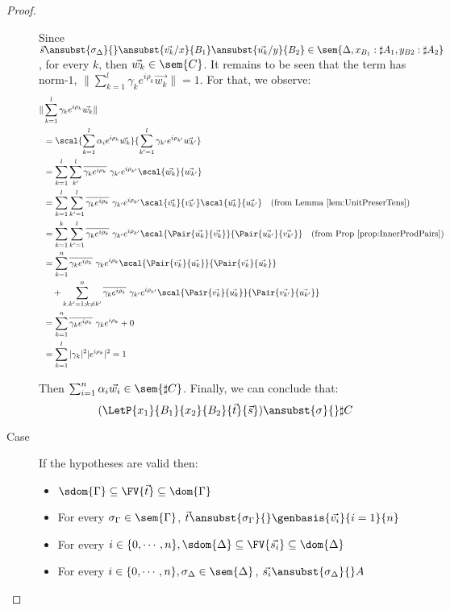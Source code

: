 \begin{proof}
\begin{description}
    Since $\vec{s}\ansubst{\sigma_\Delta}{}\ansubst{\vec{v_k}/x}{B_1}\ansubst{\vec{u_k}/y}{B_2}\in\sem{\Delta, x_{B_1}:\sharp A_1, y_{B2}:\sharp A_2}$, for every $k$, then $\vec{w_k}\in\sem{C}$. It remains to be seen that the term has norm-$1$, $\|\sum_{k=1}^{l}\gamma_k e^{i\rho_k} \vec{w_k}\|=1$. For that, we observe:
    \begin{align*}
        \|&\sum_{k=1}^{l}\gamma_k e^{i\rho_k} \vec{w_k}\| \\
        &= \scal{\sum_{k=1}^{l}\alpha_i e^{i\rho_k} \vec{w_k}}{\sum_{k'=1}^{l}\gamma_{k'} e^{i\rho_{k'}} \vec{w_{k'}}}\\
        &= \sum_{k=1}^{l}\sum_{k'}^{l}\overline{\gamma_k e^{i\rho_k}}\  \gamma_{k'} e^{i\rho_{k'}}\scal{\vec{w_k}}{\vec{w_{k'}}}\\
        &=\sum_{k=1}^{l}\sum_{k'=1}^{l}\overline{\gamma_k e^{i\rho_k}}\ \gamma_{k'} e^{i\rho_{k'}} \scal{\vec{v_k}}{\vec{v_{k'}}}\scal{\vec{u_k}}{\vec{u_{k'}}}\quad(\text{from Lemma \ref{lem:UnitPreserTens}})\\
        &= \sum_{k=1}^{k}\sum_{k'=1}^{l}\overline{\gamma_k e^{i\rho_k}}\  \gamma_{k'} e^{i\rho_{k'}} \scal{\Pair{\vec{u_k}}{\vec{v_k}}}{\Pair{\vec{u_{k'}}}{\vec{v_{k'}}}}\quad(\text{from Prop \ref{prop:InnerProdPairs}})\\
        &=\sum_{k=1}^n \overline{\gamma_k e^{i\rho_k}}\ \gamma_k e^{i\rho_k} \scal{\Pair{\vec{v_k}}{\vec{u_k}}}{\Pair{\vec{v_k}}{\vec{u_k}}} \\
        & \quad + \sum_{k,k'=1; k\neq k'}^n \overline{\gamma_k e^{i\rho_k}}\  \gamma_{k'} e^{i\rho_{k'}} \scal{\Pair{\vec{v_k}}{\vec{u_k}}}{\Pair{\vec{v_{k'}}}{\vec{u_{k'}}}}\\
        &= \sum_{k=1}^n \overline{\gamma_k e^{i\rho_k}}\ \gamma_k e^{i\rho_k} + 0 \\
        &= \sum_{k=1}^{l} |\gamma_k|^2 |e^{i\rho_k}|^2 = 1
    \end{align*}

    Then $\sum_{i=1}^{n}\alpha_i\vec{w_i}\in\sem{\sharp C}$. Finally, we can conclude that: 
    \[(\LetP{x_1}{B_1}{x_2}{B_2}{\vec{t}}{\vec{s}})\ansubst{\sigma}{}\real{\sharp C}\]

    \item[Case] If the hypotheses are valid then:
    \begin{itemize}
        \item $\sdom{\Gamma}\subseteq \FV{\vec{t}}\subseteq \dom{\Gamma}$
        \item For every $\sigma_\Gamma\in\sem{\Gamma}$, $\vec{t}\ansubst{\sigma_\Gamma}{}\real\genbasis{\vec{v_i}}{i=1}{n}$
        \item For every $i\in\{0,\dotsb ,n\}, \sdom{\Delta}\subseteq \FV{\vec{s_i}}\subseteq \dom{\Delta}$
        \item For every $i\in\{0,\dotsb ,n\}, \sigma_\Delta\in\sem{\Delta}$, $\vec{s_i}\ansubst{\sigma_\Delta}{}\real A$
    \end{itemize}


\end{description}
\end{proof}
